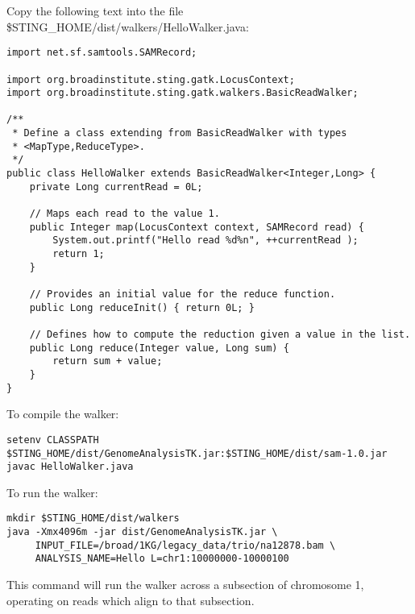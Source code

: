 \documentclass[11pt,fullpage]{article}
\begin{document}
\begin{samepage}
Copy the following text into the file \$STING\_HOME/dist/walkers/HelloWalker.java:

\begin{verbatim}
import net.sf.samtools.SAMRecord;

import org.broadinstitute.sting.gatk.LocusContext;
import org.broadinstitute.sting.gatk.walkers.BasicReadWalker;

/**
 * Define a class extending from BasicReadWalker with types
 * <MapType,ReduceType>.  
 */
public class HelloWalker extends BasicReadWalker<Integer,Long> {
    private Long currentRead = 0L;

    // Maps each read to the value 1.
    public Integer map(LocusContext context, SAMRecord read) {
        System.out.printf("Hello read %d%n", ++currentRead );
        return 1; 
    }

    // Provides an initial value for the reduce function.
    public Long reduceInit() { return 0L; }
    
    // Defines how to compute the reduction given a value in the list. 
    public Long reduce(Integer value, Long sum) { 
        return sum + value;
    }
}
\end{verbatim}
\end{samepage}
To compile the walker:
\begin{verbatim}
setenv CLASSPATH $STING_HOME/dist/GenomeAnalysisTK.jar:$STING_HOME/dist/sam-1.0.jar
javac HelloWalker.java
\end{verbatim}
To run the walker:
\begin{verbatim}
mkdir $STING_HOME/dist/walkers
java -Xmx4096m -jar dist/GenomeAnalysisTK.jar \
     INPUT_FILE=/broad/1KG/legacy_data/trio/na12878.bam \
     ANALYSIS_NAME=Hello L=chr1:10000000-10000100
\end{verbatim}
This command will run the walker across a subsection of chromosome 1, operating on 
reads which align to that subsection.  
\end{document}
